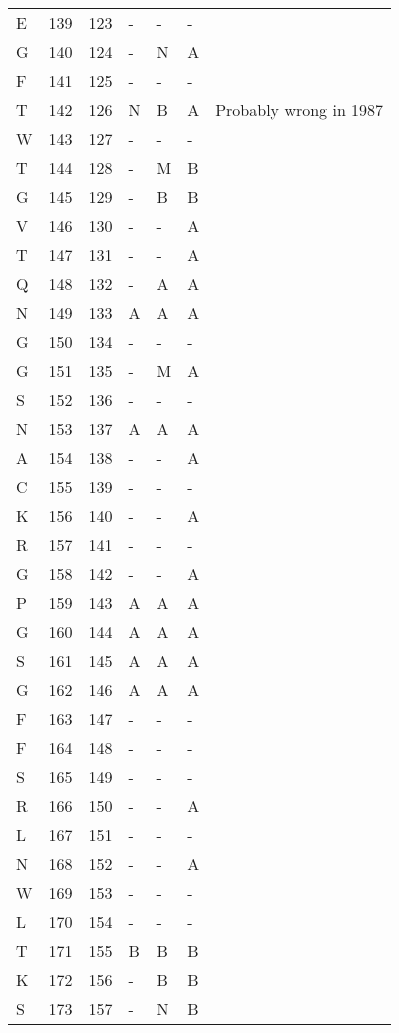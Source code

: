 \begin{longtable}{lllllll}
  E & 139 & 123 & - & - & - &  \\ 
  G & 140 & 124 & - & N & A &  \\ 
  F & 141 & 125 & - & - & - &  \\ 
  T & 142 & 126 & N & B & A & Probably wrong in 1987 \\ 
  W & 143 & 127 & - & - & - &  \\ 
  T & 144 & 128 & - & M & B &  \\ 
  G & 145 & 129 & - & B & B &  \\ 
  V & 146 & 130 & - & - & A &  \\ 
  T & 147 & 131 & - & - & A &  \\ 
  Q & 148 & 132 & - & A & A &  \\ 
  N & 149 & 133 & A & A & A &  \\ 
  G & 150 & 134 & - & - & - &  \\ 
  G & 151 & 135 & - & M & A &  \\ 
  S & 152 & 136 & - & - & - &  \\ 
  N & 153 & 137 & A & A & A &  \\ 
  A & 154 & 138 & - & - & A &  \\ 
  C & 155 & 139 & - & - & - &  \\ 
  K & 156 & 140 & - & - & A &  \\ 
  R & 157 & 141 & - & - & - &  \\ 
  G & 158 & 142 & - & - & A &  \\ 
  P & 159 & 143 & A & A & A &  \\ 
  G & 160 & 144 & A & A & A &  \\ 
  S & 161 & 145 & A & A & A &  \\ 
  G & 162 & 146 & A & A & A &  \\ 
  F & 163 & 147 & - & - & - &  \\ 
  F & 164 & 148 & - & - & - &  \\ 
  S & 165 & 149 & - & - & - &  \\ 
  R & 166 & 150 & - & - & A &  \\ 
  L & 167 & 151 & - & - & - &  \\ 
  N & 168 & 152 & - & - & A &  \\ 
  W & 169 & 153 & - & - & - &  \\ 
  L & 170 & 154 & - & - & - &  \\ 
  T & 171 & 155 & B & B & B &  \\ 
  K & 172 & 156 & - & B & B &  \\ 
  S & 173 & 157 & - & N & B &  \\ 

\end{longtable}
